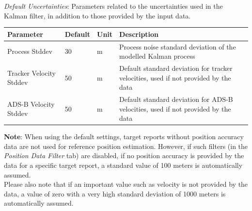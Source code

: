\textit{Default Uncertainties}: Parameters related to the uncertainties used in the Kalman filter, in addition to those provided 
by the input data.
\begin{table}[H]
    \center
    \begin{tabularx}{\textwidth}{ | l | l | l | X |}
        \hline
        \textbf{Parameter} & \textbf{Default} & \textbf{Unit} & \textbf{Description} \\ \hline
        Process Stddev & 30 & m & Process noise standard deviation of the modelled Kalman process \\ \hline
        Tracker Velocity Stddev & 50 & m & Default standard deviation for tracker velocities, 
            used if not provided by the data \\ \hline
        ADS-B Velocity Stddev & 50 & m & Default standard deviation for ADS-B velocities, 
            used if not provided by the data \\ \hline
    \end{tabularx}
\end{table}

\textbf{Note}: When using the default settings, target reports without position accuracy data are not used for reference position estimation. However, if such filters (in the \textit{Position Data Filter} tab) are disabled, if no position accuracy is provided by the data for a specific target report, a standard value of 100 meters is automatically assumed. \\

Please also note that if an important value such as velocity is not provided by the data, a value of zero with a very high standard deviation of 1000 meters is automatically assumed. \\


